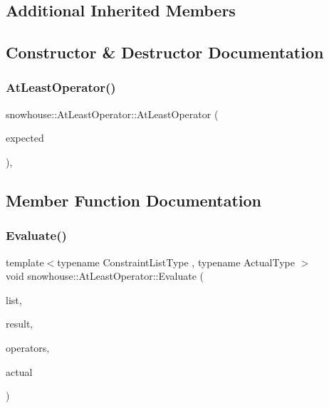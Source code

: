 \subsection*{Additional Inherited Members}


\subsection{Constructor \& Destructor Documentation}
\mbox{\label{structsnowhouse_1_1AtLeastOperator_a451b4302344d32b1f5d09a446c45bb6a}} 
\subsubsection{\texorpdfstring{AtLeastOperator()}{AtLeastOperator()}}
{\footnotesize\ttfamily snowhouse\+::\+At\+Least\+Operator\+::\+At\+Least\+Operator (\begin{DoxyParamCaption}\item[{unsigned int}]{expected }\end{DoxyParamCaption})\hspace{0.3cm}{\ttfamily [inline]}, {\ttfamily [explicit]}}



\subsection{Member Function Documentation}
\mbox{\label{structsnowhouse_1_1AtLeastOperator_ab00fe1f6a697d5bb248b8d034924a56f}} 
\subsubsection{\texorpdfstring{Evaluate()}{Evaluate()}}
{\footnotesize\ttfamily template$<$typename Constraint\+List\+Type , typename Actual\+Type $>$ \\
void snowhouse\+::\+At\+Least\+Operator\+::\+Evaluate (\begin{DoxyParamCaption}\item[{Constraint\+List\+Type \&}]{list,  }\item[{\mbox{\hyperlink{namespacesnowhouse_a719169b1315a13161c15f25e600a8f51}{Result\+Stack}} \&}]{result,  }\item[{\mbox{\hyperlink{namespacesnowhouse_adcb10e215e6a4bbcb35722a9c7270fc6}{Operator\+Stack}} \&}]{operators,  }\item[{const Actual\+Type \&}]{actual }\end{DoxyParamCaption})\hspace{0.3cm}{\ttfamily [inline]}}




